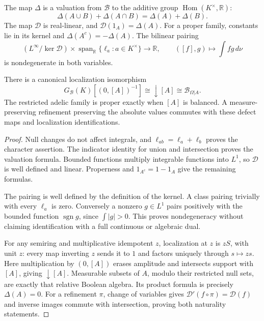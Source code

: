 \begin{theorem}\label{thm:measured-defect}
The map $\Delta$ is a valuation from $\mathcal B$ to the additive group
$\operatorname{Hom}(K^\times,\mathbb R)$:
\[
 \Delta(A\cup B)+\Delta(A\cap B)=\Delta(A)+\Delta(B).
\]
The map $\mathcal D$ is real-linear, and $\mathcal D(1_A)=\Delta(A)$.
For a proper family, constants lie in its kernel and
$\Delta(A^c)=-\Delta(A)$. The bilinear pairing
\[
 \left(L^\infty/\ker\mathcal D\right)
 \times\operatorname{span}_{\mathbb R}\{\ell_a:a\in K^\times\}
 \longrightarrow\mathbb R,
 \qquad([f],g)\longmapsto\int fg\,d\nu
\]
is nondegenerate in both variables.

There is a canonical localization isomorphism
\[
 G_{\mathcal B}(K)[(0,[A])^{-1}]
 \cong\downarrow[A]\cong\mathcal B_{\Omega|A}.
\]
The restricted adelic family is proper exactly when $[A]$ is balanced.
A measure-preserving refinement preserving the absolute values commutes
with these defect maps and localization identifications.
\end{theorem}
\begin{proof}
Null changes do not affect integrals, and $\ell_{ab}=\ell_a+\ell_b$ proves
the character assertion. The indicator identity for union and intersection
proves the valuation formula. Bounded functions multiply integrable
functions into $L^1$, so $\mathcal D$ is well defined and linear. Properness
and $1_{A^c}=1-1_A$ give the remaining formulas.

The pairing is well defined by the definition of the kernel. A class
pairing trivially with every $\ell_a$ is zero. Conversely a nonzero
$g\in L^1$ pairs positively with the bounded function $\operatorname{sgn}g$,
since $\int|g|>0$. This proves nondegeneracy without claiming identification
with a full continuous or algebraic dual.

For any semiring and multiplicative idempotent $z$, localization at $z$
is $zS$, with unit $z$: every map inverting $z$ sends it to $1$ and factors
uniquely through $s\mapsto zs$. Here multiplication by $(0,[A])$ erases
amplitude and intersects support with $[A]$, giving $\downarrow[A]$.
Measurable subsets of $A$, modulo their restricted null sets, are exactly
that relative Boolean algebra. Its product formula is precisely
$\Delta(A)=0$. For a refinement $\pi$, change of variables gives
$\mathcal D'(f\circ\pi)=\mathcal D(f)$ and inverse images commute with
intersection, proving both naturality statements.
\end{proof}

